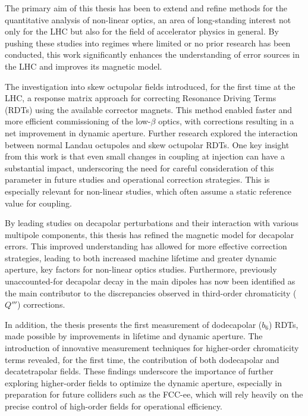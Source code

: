 \label{chapter:conclusions}

The primary aim of this thesis has been to extend and refine methods for the quantitative analysis
of non-linear optics, an area of long-standing interest not only for the LHC but also for the field
of accelerator physics in general. By pushing these studies into regimes where limited or no prior
research has been conducted, this work significantly enhances the understanding of error sources in
the LHC and improves its magnetic model.

The investigation into skew octupolar fields introduced, for the first time at the LHC, a response
matrix approach for correcting Resonance Driving Terms (RDTs) using the available corrector magnets.
This method enabled faster and more efficient commissioning of the low-$\beta$ optics, with
corrections resulting in a net improvement in dynamic aperture. Further research explored the
interaction between normal Landau octupoles and skew octupolar RDTs. One key insight from this work
is that even small changes in coupling at injection can have a substantial impact, underscoring the
need for careful consideration of this parameter in future studies and operational correction
strategies. This is especially relevant for non-linear studies, which often assume a static
reference value for coupling.

By leading studies on decapolar perturbations and their interaction with various multipole
components, this thesis has refined the magnetic model for decapolar errors. This improved
understanding has allowed for more effective correction strategies, leading to both increased
machine lifetime and greater dynamic aperture, key factors for non-linear optics studies.
Furthermore, previously unaccounted-for decapolar decay in the main dipoles has now been identified
as the main contributor to the discrepancies observed in third-order chromaticity ($Q'''$)
corrections.

In addition, the thesis presents the first measurement of dodecapolar ($b_6$) RDTs, made possible by
improvements in lifetime and dynamic aperture. The introduction of innovative measurement techniques
for higher-order chromaticity terms revealed, for the first time, the contribution of both
dodecapolar and decatetrapolar fields. These findings underscore the importance of further exploring
higher-order fields to optimize the dynamic aperture, especially in preparation for future colliders
such as the FCC-ee, which will rely heavily on the precise control of high-order fields for
operational efficiency.

